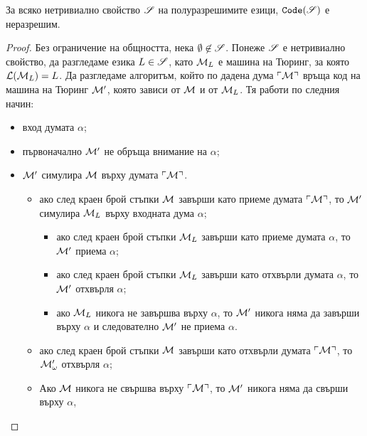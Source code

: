 \begin{framed}
  \begin{thm}
    За всяко нетривиално свойство $\mathscr{S}$ на полуразрешимите езици,
    $\texttt{Code}(\mathscr{S})$ е неразрешим.
  \end{thm}  
\end{framed}
\begin{proof}
  Без ограничение на общността, нека $\emptyset \not\in \mathscr{S}$.
  Понеже $\mathscr{S}$ е нетривиално свойство, да разгледаме езика $L \in \mathscr{S}$,
  като $\mathcal{M}_L$ е машина на Тюринг, за която $\mathcal{L}(\mathcal{M}_L) = L$.
  Да разгледаме алгоритъм, който по дадена дума $\ulcorner{\mathcal{M}}\urcorner$
  връща код на машина на Тюринг $\mathcal{M}'$, която зависи от $\mathcal{M}$ и от $\mathcal{M}_L$.
  Тя работи по следния начин:
  \begin{itemize}
  \item
    вход думата $\alpha$;
  \item
    първоначално $\mathcal{M}'$ не обръща внимание на $\alpha$;
  \item
    $\mathcal{M}'$ симулира $\mathcal{M}$ върху думата $\ulcorner{\mathcal{M}}\urcorner$.
    \begin{itemize}
    \item
      ако след краен брой стъпки $\mathcal{M}$ завърши като приеме думата $\ulcorner{\mathcal{M}}\urcorner$, то 
      $\mathcal{M}'$ симулира $\mathcal{M}_L$ върху входната дума $\alpha$;
      \begin{itemize}
      \item
        ако след краен брой стъпки $\mathcal{M}_L$ завърши като приеме думата $\alpha$, то 
        $\mathcal{M}'$ приема $\alpha$;
      \item 
        ако след краен брой стъпки $\mathcal{M}_L$ завърши като отхвърли думата $\alpha$, то 
        $\mathcal{M}'$ отхвърля $\alpha$;
      \item
        ако $\mathcal{M}_L$ никога не завършва върху $\alpha$, то 
        $\mathcal{M}'$ никога няма да завърши върху $\alpha$ и следователно $\mathcal{M}'$
        не приема $\alpha$.
      \end{itemize}
    \item
      ако след краен брой стъпки $\mathcal{M}$ завърши като отхвърли думата $\ulcorner{\mathcal{M}}\urcorner$, то 
      $\mathcal{M}'_\omega$ отхвърля $\alpha$;
    \item
      Ако $\mathcal{M}$ никога не свършва върху $\ulcorner{\mathcal{M}}\urcorner$, то $\mathcal{M}'$ никога няма да свърши върху $\alpha$,

\end{itemize}
\end{itemize}
\end{proof}
